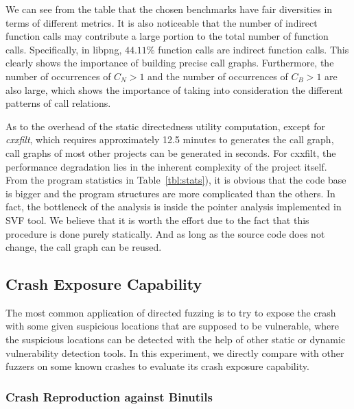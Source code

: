 We can see from  the table that the chosen benchmarks have fair diversities in terms of different metrics.
It is also noticeable that the number of indirect function calls may contribute a large portion to the total number of function calls.
Specifically, in libpng, $44.11\%$ function calls are indirect function calls.
This clearly shows the importance of building precise call graphs.
Furthermore, the number of occurrences of $C_N>1$ and the number of occurrences of $C_B>1$ are also large, which shows the importance of taking into consideration the different patterns of call relations.




As to the overhead of the static directedness utility computation, except for \emph{cxxfilt}, which requires approximately 12.5 minutes to generates the call graph, call graphs of most other projects can be generated in seconds. For cxxfilt, the performance degradation lies in the inherent complexity of the project itself. From the program statistics in Table~\ref{tbl:stats}), it is obvious that the code base is bigger and the program structures are more complicated than the others. In fact, the bottleneck of the analysis is inside the pointer analysis implemented in SVF tool. We believe that it is worth the effort due to the fact that this procedure is done purely statically. And as long as the source code does not change, the call graph can be reused.


\subsection{Crash Exposure Capability}\label{subsec:evalcrashrepro}

The most common application of directed fuzzing is to try to expose the crash with some given suspicious locations that are supposed to be vulnerable, where the suspicious locations can be detected with the help of other static or dynamic vulnerability detection tools.
In this experiment, we directly compare {\dFOT} with other fuzzers on some known crashes to evaluate its crash exposure capability.

\subsubsection{Crash Reproduction against Binutils}

